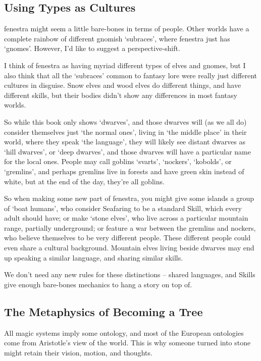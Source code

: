 \begin{multicols}{2}
\subsection{Using Types as Cultures}

\Gls{fenestra} might seem a little bare-bones in terms of people.
Other worlds have a complete rainbow of different gnomish `subraces', where \gls{fenestra} just has `gnomes'.
However, I'd like to suggest a perspective-shift.

I think of \gls{fenestra} as having myriad different types of elves and gnomes, but I also think that all the `subraces' common to fantasy lore were really just different cultures in disguise.
Snow elves and wood elves do different things, and have different skills, but their bodies didn't show any differences in most fantasy worlds.

So while this book only shows `dwarves', and those dwarves will (as we all do) consider themselves just `the normal ones', living in `the middle place' in their world, where they speak `the language', they will likely see distant dwarves as `hill dwarves', or `deep dwarves', and those dwarves will have a particular name for the local ones.
People may call goblins `svarts', `nockers', `kobolds', or `gremlins', and perhaps gremlins live in forests and have green skin instead of white, but at the end of the day, they're all goblins.

So when making some new part of \gls{fenestra}, you might give some islands a group of `boat humans', who consider Seafaring to be a standard Skill, which every adult should have; or make `stone elves', who live across a particular mountain range, partially underground; or feature a war between the gremlins and nockers, who believe themselves to be very different people.
These different people could even share a cultural background.
Mountain elves living beside dwarves may end up speaking a similar language, and sharing similar skills.

We don't need any new rules for these distinctions -- shared languages, and Skills give enough bare-bones mechanics to hang a story on top of.

\subsection{The Metaphysics of Becoming a Tree}

All magic systems imply some ontology, and most of the European ontologies come from Aristotle's view of the world.
This is why someone turned into stone might retain their vision, motion, and thoughts.


\end{multicols}
